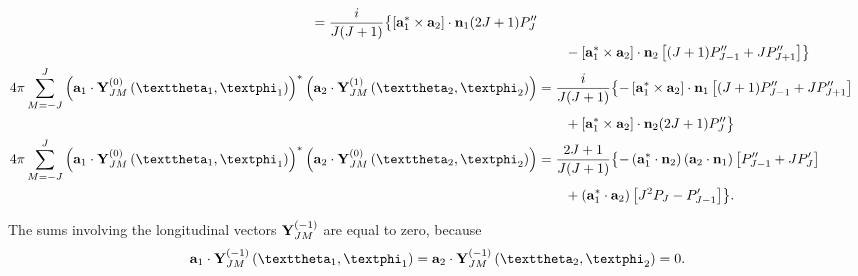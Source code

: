 \begin{enumerate}[label=(\alph*)]
\begin{fleqn}
\begin{align}
=\frac{i}{J(J+1)}\bigl\{\left[\vect{a}_{1}^{*} \times \vect{a}_{2}\right] \cdot \vect{n}_{1}(2 J+1) P_{J}^{\prime \prime}\notag\\&
\qquad-\left[\vect{a}_{1}^{*} \times \vect{a}_{2}\right] \cdot \vect{n}_{2}\left[(J+1) P_{J-1}^{\prime \prime}+J P_{J+1}^{\prime \prime}\right]\bigr\}  \label{eq:7:3:112}\\ 
4 \pi \sum_{M=-J}^{J}\left(\vect{a}_{1} \cdot \vect{Y}_{J M}^{(0)}\left(\vartheta_{1}, \varphi_{1}\right)\right)^{*}\left(\vect{a}_{2} \cdot \vect{Y}_{J M}^{(1)}\left(\vartheta_{2}, \varphi_{2}\right)\right) &
=\frac{i}{J(J+1)}\bigl\{-\left[\vect{a}_{1}^{*} \times \vect{a}_{2}\right] \cdot \vect{n}_{1}\left[(J+1) P_{J-1}^{\prime \prime}+J P_{J+1}^{\prime \prime}\right]\notag\\
&\qquad+\left[\vect{a}_{1}^{*} \times \vect{a}_{2}\right] \cdot \vect{n}_{2}(2 J+1) P_{J}^{\prime \prime}\bigr\}  \notag\\
4 \pi \sum_{M=-J}^{J}\left(\vect{a}_{1} \cdot \vect{Y}_{J M}^{(0)}\left(\vartheta_{1}, \varphi_{1}\right)\right)^{*}\left(\vect{a}_{2} \cdot \vect{Y}_{J M}^{(0)}\left(\vartheta_{2}, \varphi_{2}\right)\right) &
=\frac{2 J+1}{J(J+1)}\bigl\{-\left(\vect{a}_{1}^{*} \cdot \vect{n}_{2}\right)\left(\vect{a}_{2} \cdot \vect{n}_{1}\right)\left[P_{J-1}^{\prime \prime}+J P_{J}^{\prime}\right]
\notag\\
&\qquad+\left(\vect{a}_{1}^{*} \cdot \vect{a}_{2}\right)\left[J^{2} P_{J}-P_{J-1}^{\prime}\right]\bigr\}.  \label{eq:7:3:113}
\end{align}
\end{fleqn}
The sums involving the longitudinal vectors $\mathbf{Y}_{J M}^{(-1)}$ are equal to zero, because
\[
\vect{a}_{1} \cdot \vect{Y}_{J M}^{(-1)}\left(\vartheta_{1}, \varphi_{1}\right)=\vect{a}_{2} \cdot \vect{Y}_{J M}^{(-1)}\left(\vartheta_{2}, \varphi_{2}\right)=0 .
\]
\end{enumerate}
